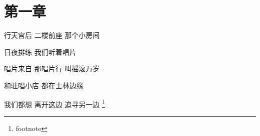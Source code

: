 \documentclass[a4paper,12pt]{ctexart}
\newcommand{\学年学期}{2020-2021学年第1学期}
\newcommand{\课程名称}{课程名}
\newcommand{\论文题目}{论文题目}
\newcommand{\任课教师}{教师名}
\newcommand{\系别}{中国电影高新技术研究院}
\newcommand{\研究方向}{数字电影技术}
\newcommand{\姓名}{姓名}
\newcommand{\年级}{2021}
\newcommand{\学号}{04212193}
\newcommand{\完成时间}{2023年9月3日}
\begin{document}
\makecoverpage

\section{第一章}

行天宫后 二楼前座 那个小房间

日夜排练 我们听着唱片

唱片来自 那唱片行 叫摇滚万岁

和驻唱小店 都在士林边缘

我们都想 离开这边 追寻另一边
\footnote{footnote}
\end{document}
